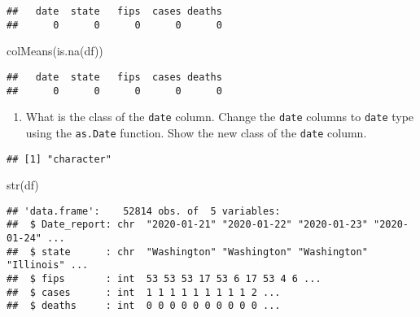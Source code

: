 \documentclass[
]{article}
\newenvironment{Shaded}{\begin{snugshade}}{\end{snugshade}}
\newcommand{\DecValTok}[1]{\textcolor[rgb]{0.00,0.00,0.81}{#1}}
\newcommand{\FunctionTok}[1]{\textcolor[rgb]{0.00,0.00,0.00}{#1}}
\newcommand{\NormalTok}[1]{#1}
\newcommand{\OtherTok}[1]{\textcolor[rgb]{0.56,0.35,0.01}{#1}}
\newcommand{\SpecialCharTok}[1]{\textcolor[rgb]{0.00,0.00,0.00}{#1}}
\newcommand{\StringTok}[1]{\textcolor[rgb]{0.31,0.60,0.02}{#1}}
\providecommand{\tightlist}{%
  \setlength{\itemsep}{0pt}\setlength{\parskip}{0pt}}
\begin{document}
\begin{verbatim}
##   date  state   fips  cases deaths 
##      0      0      0      0      0
\end{verbatim}

\begin{Shaded}
\begin{Highlighting}[]
\FunctionTok{colMeans}\NormalTok{(}\FunctionTok{is.na}\NormalTok{(df))}
\end{Highlighting}
\end{Shaded}

\begin{verbatim}
##   date  state   fips  cases deaths 
##      0      0      0      0      0
\end{verbatim}

\begin{enumerate}
\def\labelenumi{\arabic{enumi}.}
\setcounter{enumi}{4}
\tightlist
\item
  What is the class of the \texttt{date} column. Change the
  \texttt{date} columns to \texttt{date} type using the \texttt{as.Date}
  function. Show the new class of the \texttt{date} column.
\end{enumerate}

\begin{Shaded}
\end{Shaded}

\begin{verbatim}
## [1] "character"
\end{verbatim}

\begin{Shaded}
\begin{Highlighting}[]
\FunctionTok{str}\NormalTok{(df)}
\end{Highlighting}
\end{Shaded}

\begin{verbatim}
## 'data.frame':    52814 obs. of  5 variables:
##  $ Date_report: chr  "2020-01-21" "2020-01-22" "2020-01-23" "2020-01-24" ...
##  $ state      : chr  "Washington" "Washington" "Washington" "Illinois" ...
##  $ fips       : int  53 53 53 17 53 6 17 53 4 6 ...
##  $ cases      : int  1 1 1 1 1 1 1 1 1 2 ...
##  $ deaths     : int  0 0 0 0 0 0 0 0 0 0 ...
\end{verbatim}
\end{document}
